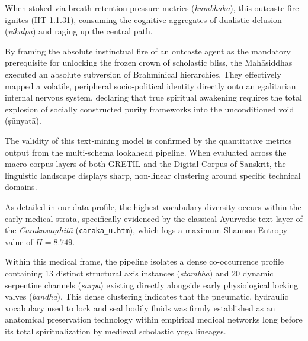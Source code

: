 \documentclass[11pt,twoside,letterpaper]{article}
\begin{document}
When stoked via breath-retention pressure metrics (\textit{kumbhaka}), this outcaste fire ignites (HT 1.1.31), consuming the cognitive aggregates of dualistic delusion (\textit{vikalpa}) and raging up the central path.

By framing the absolute instinctual fire of an outcaste agent as the mandatory prerequisite for unlocking the frozen crown of scholastic bliss, the Mahāsiddhas executed an absolute subversion of Brahminical hierarchies. They effectively mapped a volatile, peripheral socio-political identity directly onto an egalitarian internal nervous system, declaring that true spiritual awakening requires the total explosion of socially constructed purity frameworks into the unconditioned void (ṣūnyatā).

The validity of this text-mining model is confirmed by the quantitative metrics output from the multi-schema lookahead pipeline. When evaluated across the macro-corpus layers of both GRETIL and the Digital Corpus of Sanskrit, the linguistic landscape displays sharp, non-linear clustering around specific technical domains. 

As detailed in our data profile, the highest vocabulary diversity occurs within the early medical strata, specifically evidenced by the classical Ayurvedic text layer of the \textit{Carakasaṃhitā} (\texttt{caraka\_u.htm}), which logs a maximum Shannon Entropy value of $H = 8.749$. 

Within this medical frame, the pipeline isolates a dense co-occurrence profile containing 13 distinct structural axis instances (\textit{stambha}) and 20 dynamic serpentine channels (\textit{sarpa}) existing directly alongside early physiological locking valves (\textit{bandha}). This dense clustering indicates that the pneumatic, hydraulic vocabulary used to lock and seal bodily fluids was firmly established as an anatomical preservation technology within empirical medical networks long before its total spiritualization by medieval scholastic yoga lineages.
\end{document}
